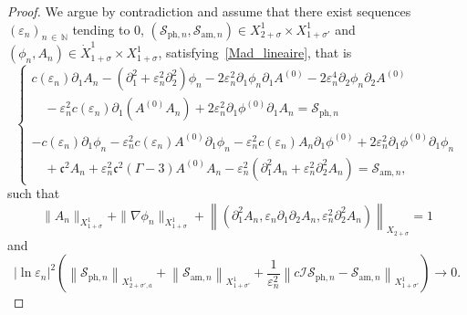 \documentclass[AHL,Unicode,longabstracts,published]{cedram}
\newcommand*\p{\partial}
\newcommand*\N{\mathbb N}
\newcommand{\amm}{\mathrm{am}}
\newcommand{\phl}{\mathrm{ph}}
\newcommand*\BI{\mathcal{I}}
\newcommand*\BS{\mathcal{S}}
\newcommand*\cs{{\mathfrak c}}
\newcommand*\e{\varepsilon}
\newcommand*\s{\sigma}
\begin{document}
\begin{proof} 
We argue by contradiction and assume that there exist sequences $ (\e_n)_{n\,\in\,\N} $ tending to $0$, $ (\BS_{{\phl},n}, \BS_{{\amm},n}) \in X^1_{2+\sigma} \times X^1_{1+ \sigma'} $ and $ (\phi_n, A_n) \in \dot{X}^1_{1+\s} \times X^1_{1+\s} $, satisfying~\eqref{Mad_lineaire}, that is
\begin{equation}\label{syst_absurde}
\left\{
\begin{array}{ll}
c (\e_n) \p_{1} A_n - \left(\p_{1}^2 + \e_n^2 \p^2_{2}\right) \phi_n - 2 \e_n^2 \p_{1} \phi_n \p_{1} A^{(0)} - 2 \e_n^4 \p_{2} \phi_n \p_{2} A^{(0)}
\\
\quad - \e_n^2 c(\e_n) \p_1 \left(A^{(0)} A_n\right) + 2 \e_n^2 \p_{1} \phi^{(0)} \p_{1} A_n = \BS_{{\phl},n} \\ \ \\
- c(\e_n) \p_{1} \phi_n - \e_n^2 c (\e_n) A^{(0)} \p_1 \phi_n - \e_n^2 c(\e_n) A_n \p_1 \phi^{(0)} + 2 \e_n^2 \p_{1} \phi^{(0)} \p_{1} \phi_n
\\
\quad + \cs^2 A_n + \e_n^2 \cs^2 (\Gamma -3) A^{(0)} A_n - \e_n^2 \left(\p_{1}^2 A_n + \e_n^2 \p_{2}^2 A_n\right) = \BS_{{\amm},n},
\end{array}\right.
\end{equation}
such that
\begin{equation}\label{hypoth1}
\| A_n \|_{ X^1_{ 1+\s} } + \| \nabla \phi_n \|_{ X^1_{ 1 +\s} } + \left\| \left(\p_1^2 A_n, \e_n \p_1\p_2 A_n, \e_n^2 \p_2^2 A_n \right)\right\|_{ X_{ 2+\s} } = 1
\end{equation}
and
\begin{equation}\label{hypoth2}
\lvert \ln \e_n \rvert^2 \left(\left\| \BS_{{\phl},n} \right\|_{ X^1_{2+\s', a} } + \left\| \BS_{{\amm},n} \right\|_{ X^1_{1+\s'} } + \frac{1}{\e_n^2} \left\| c \BI \BS_{{\phl},n} - \BS_{{\amm},n} \right\|_{ X^1_{1+\s'} }
\right)
\to 0.
\end{equation}


\end{proof}
\end{document}
